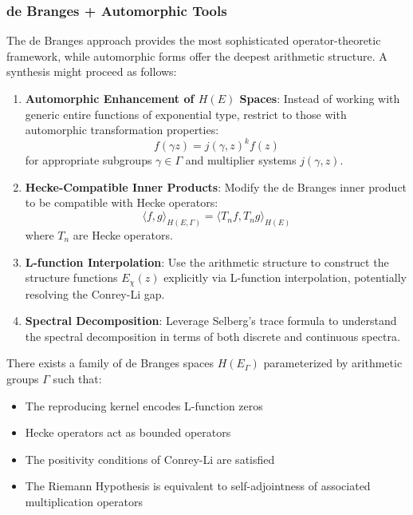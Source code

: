 \subsubsection{de Branges + Automorphic Tools}
\label{subsubsec:debranges_automorphic}

The de Branges approach provides the most sophisticated operator-theoretic framework, while automorphic forms offer the deepest arithmetic structure. A synthesis might proceed as follows:

\begin{approach}
\begin{enumerate}
\item \textbf{Automorphic Enhancement of $H(E)$ Spaces}: Instead of working with generic entire functions of exponential type, restrict to those with automorphic transformation properties:
\begin{equation}
f(\gamma z) = j(\gamma, z)^k f(z)
\end{equation}
for appropriate subgroups $\gamma \in \Gamma$ and multiplier systems $j(\gamma, z)$.

\item \textbf{Hecke-Compatible Inner Products}: Modify the de Branges inner product to be compatible with Hecke operators:
\begin{equation}
\langle f, g \rangle_{H(E,\Gamma)} = \langle T_n f, T_n g \rangle_{H(E)}
\end{equation}
where $T_n$ are Hecke operators.

\item \textbf{L-function Interpolation}: Use the arithmetic structure to construct the structure functions $E_\chi(z)$ explicitly via L-function interpolation, potentially resolving the Conrey-Li gap.

\item \textbf{Spectral Decomposition}: Leverage Selberg's trace formula to understand the spectral decomposition in terms of both discrete and continuous spectra.
\end{enumerate}
\end{approach}

\begin{conjecture}
There exists a family of de Branges spaces $H(E_\Gamma)$ parameterized by arithmetic groups $\Gamma$ such that:
\begin{itemize}
\item The reproducing kernel encodes L-function zeros
\item Hecke operators act as bounded operators
\item The positivity conditions of Conrey-Li are satisfied
\item The Riemann Hypothesis is equivalent to self-adjointness of associated multiplication operators
\end{itemize}
\end{conjecture}

